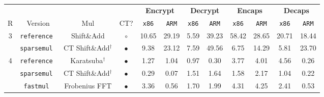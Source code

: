 \begin{table}[ht]\small
    \centering
    \begin{tabular}{c | c c c || c c | c c | c c | c c }
        & & & &  \multicolumn{2}{c|}{\textbf{Encrypt}} & \multicolumn{2}{c|}{\textbf{Decrypt}} &  \multicolumn{2}{c|}{\textbf{Encaps}} & \multicolumn{2}{c}{\textbf{Decaps}}\\
        R & Version & Mul & CT? & \texttt{x86} & \texttt{ARM} & \texttt{x86} & \texttt{ARM} & \texttt{x86} & \texttt{ARM} & \texttt{x86} & \texttt{ARM} \\
        \hline
        \multirow{2}{*}{3}
        & \tt{reference} & Shift\&Add & $\circ$ & 10.65 & 29.19 & 5.59 & 39.23 & 58.42 & 28.65 & 20.71 & 18.44\\
        & \tt{sparsemul} & CT Shift\&Add$^\dagger$ & $\bullet$ & 9.38 & 23.12 & 7.59 & 49.56 & 6.75 & 14.29 & 5.81 & 23.70 \\
        \hline
        \hline 
        \multirow{3}{*}{4}
        & \tt{reference} & Karatsuba$^\dagger$ & $\bullet$ & 1.27 & 1.04 & 0.97 & 0.30 & 3.77 & 4.01 & 4.56 & 0.26\\
        & \tt{sparsemul} & CT Shift\&Add$^\dagger$ & $\bullet$ & 0.29 & 0.07 & 1.51 & 1.64 & 1.58 & 2.17 & 1.04 & 0.22 \\
        & \tt{fastmul} & Frobenius FFT & $\bullet$ & 3.36 & 0.56 & 1.70 & 1.99 & 4.31 & 4.25 & 2.41 & 0.53 
    \end{tabular}
\end{table}




